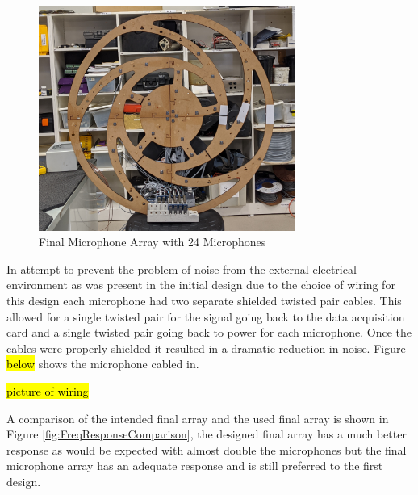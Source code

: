 \documentclass{UoNMCHA}
\numberwithin{equation}{section}
\begin{document}
    \begin{figure} [H]
        \centering
        \includegraphics[keepaspectratio, width = 0.75\textwidth]{Figures/FinalArrayBuilt.png}
        \caption{Final Microphone Array with 24 Microphones}
        \label{fig:FinalBuild}
    \end{figure}

    In attempt to prevent the problem of noise from the external electrical environment as was present in the initial design due to the choice of wiring for this design each microphone had two separate shielded twisted pair cables. This allowed for a single twisted pair for the signal going back to the data acquisition card and a single twisted pair going back to power for each microphone. Once the cables were properly shielded it resulted in a dramatic reduction in noise. Figure \hl{below} shows the microphone cabled in. 

    \hl{picture of wiring}
    
    A comparison of the intended final array and the used final array is shown in Figure \ref{fig:FreqResponseComparison}, the designed final array has a much better response as would be expected with almost double the microphones but the final microphone array has an adequate response and is still preferred to the first design.
    
\end{document}
